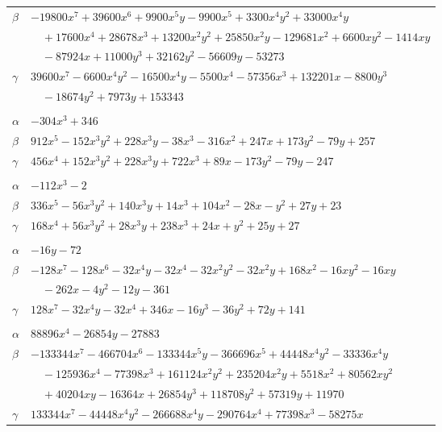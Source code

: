 \documentclass[11pt]{article}
\begin{document}
\begin{longtable}{@{}ll@{}}
$\beta$ & $-19800x^{7}+39600x^{6}+9900x^{5}y-9900x^{5}+3300x^{4}y^{2}+33000x^{4}y$\\
 & $\quad +17600x^{4}+28678x^{3}+13200x^{2}y^{2}+25850x^{2}y-129681x^{2}+6600xy^{2}-1414xy$\\
 & $\quad -87924x+11000y^{3}+32162y^{2}-56609y-53273$\\
$\gamma$ & $39600x^{7}-6600x^{4}y^{2}-16500x^{4}y-5500x^{4}-57356x^{3}+132201x-8800y^{3}$\\
 & $\quad -18674y^{2}+7973y+153343$\\
\addlinespace[3pt]
\multicolumn{2}{@{}l}{$\{i,j\}=\{42,54\}$, $k_{ij}=2^{4}\cdot 3\cdot 7$}\\
$\alpha$ & $-304x^{3}+346$\\
$\beta$ & $912x^{5}-152x^{3}y^{2}+228x^{3}y-38x^{3}-316x^{2}+247x+173y^{2}-79y+257$\\
$\gamma$ & $456x^{4}+152x^{3}y^{2}+228x^{3}y+722x^{3}+89x-173y^{2}-79y-247$\\
\addlinespace[3pt]
\multicolumn{2}{@{}l}{$\{i,j\}=\{42,55\}$, $k_{ij}=2$}\\
$\alpha$ & $-112x^{3}-2$\\
$\beta$ & $336x^{5}-56x^{3}y^{2}+140x^{3}y+14x^{3}+104x^{2}-28x-y^{2}+27y+23$\\
$\gamma$ & $168x^{4}+56x^{3}y^{2}+28x^{3}y+238x^{3}+24x+y^{2}+25y+27$\\
\addlinespace[3pt]
\multicolumn{2}{@{}l}{$\{i,j\}=\{42,60\}$, $k_{ij}=7$}\\
$\alpha$ & $-16y-72$\\
$\beta$ & $-128x^{7}-128x^{6}-32x^{4}y-32x^{4}-32x^{2}y^{2}-32x^{2}y+168x^{2}-16xy^{2}-16xy$\\
 & $\quad -262x-4y^{2}-12y-361$\\
$\gamma$ & $128x^{7}-32x^{4}y-32x^{4}+346x-16y^{3}-36y^{2}+72y+141$\\
\addlinespace[3pt]
\multicolumn{2}{@{}l}{$\{i,j\}=\{42,75\}$, $k_{ij}=3\cdot 7^{3}$}\\
$\alpha$ & $88896x^{4}-26854y-27883$\\
$\beta$ & $-133344x^{7}-466704x^{6}-133344x^{5}y-366696x^{5}+44448x^{4}y^{2}-33336x^{4}y$\\
 & $\quad -125936x^{4}-77398x^{3}+161124x^{2}y^{2}+235204x^{2}y+5518x^{2}+80562xy^{2}$\\
 & $\quad +40204xy-16364x+26854y^{3}+118708y^{2}+57319y+11970$\\
$\gamma$ & $133344x^{7}-44448x^{4}y^{2}-266688x^{4}y-290764x^{4}+77398x^{3}-58275x$\\

\end{longtable}
\end{document}
